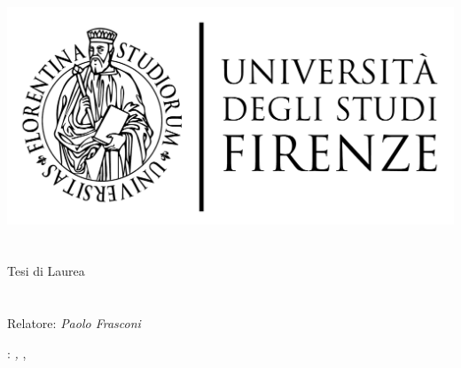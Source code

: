 \begin{titlepage}
	\begin{center}
   	\large
      \hfill
      \vfill
      \begingroup
         \includegraphics[scale=0.15]{logo/LOGO}\\
			\myFaculty \\
			\myDegree \\ 
			\vspace{0.5cm}
         \vspace{0.5cm}    
         Tesi di Laurea    
      \endgroup 
      \vfill 
      \begingroup
      	\color{Maroon}\spacedallcaps{\myItalianTitle} \\ $\ $\\
      	\spacedallcaps{\myEnglishTitle} \\ 	
	\bigskip
      \endgroup
      \spacedlowsmallcaps{\myName}
      \vfill 
      \vfill
      Relatore: \emph{Paolo Frasconi}\\
      \vfill
      \vfill
      \myTime
      \vfill                      
	\end{center}        
\end{titlepage}   
   \newpage
	\thispagestyle{empty}
	\hfill
	\vfill
	\noindent\myName: 
	\textit{\myItalianTitle,} 
	\myDegree, \textcopyright\ \myTime
